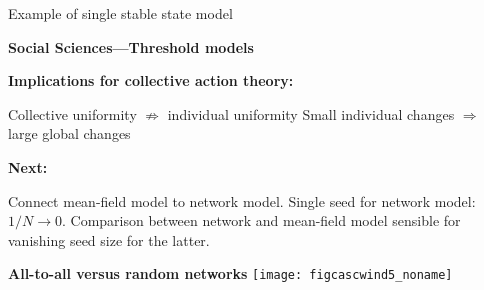   
   Example of single stable state model
  



  \textbf{Social Sciences---Threshold models}

  \textbf{Implications for collective action theory:}
    
     Collective uniformity $\not\Rightarrow$ individual uniformity
     Small individual changes $\Rightarrow$ large global changes
    
  

  \textbf{Next:}
    
     Connect mean-field model to network model.
     Single seed for network model: $1/N \rightarrow 0$.
     Comparison between network and mean-field model
      sensible for vanishing seed size for the latter.
    
  



  \textbf{All-to-all versus random networks}
  \centering
  \texttt{[image: figcascwind5\_noname]}\\

  



